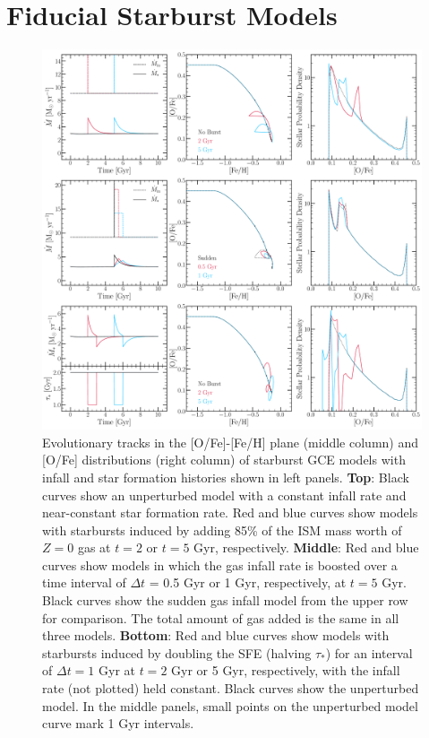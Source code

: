 
\section{Fiducial Starburst Models}
\label{bursts:sec:fiducial}

\begin{figure} %
\centering
\includegraphics[scale = 0.29]{fiducial_bursts.pdf}
\caption{
Evolutionary tracks in the [O/Fe]-[Fe/H] plane (middle column) and [O/Fe] 
distributions (right column) of starburst GCE models with infall and star 
formation histories shown in left panels. \textbf{Top}: Black curves show an 
unperturbed model with a constant infall rate and near-constant star formation 
rate. Red and blue curves show models with starbursts induced by adding 85\% of 
the ISM mass worth of $Z = 0$ gas at $t = 2$ or $t = 5$ Gyr, 
respectively. \textbf{Middle}: Red and blue curves show models in which the 
gas infall rate is boosted over a time interval of $\Delta t$ = 0.5 Gyr or 1 
Gyr, respectively, at $t = 5$ Gyr. Black curves show the sudden gas infall 
model from the upper row for comparison. The total amount of gas added is the 
same in all three models. \textbf{Bottom}: Red and blue curves show models with 
starbursts induced by doubling the SFE (halving $\tau_*$) for an interval of 
$\Delta t = 1$ Gyr at $t = 2$ Gyr or 5 Gyr, respectively, with the infall rate 
(not plotted) held constant. Black curves show the unperturbed model. In the 
middle panels, small points on the unperturbed model curve mark 1 Gyr 
intervals. 
}
\label{bursts:fig:fiducial_cases}
\end{figure}

